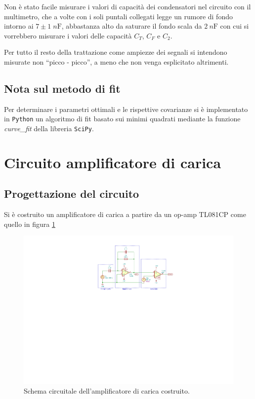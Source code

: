 \documentclass[10pt, a4paper, italian]{article}
\begin{document}
Non è stato facile misurare i valori di capacità dei condensatori nel
circuito con il multimetro, che a volte con i soli puntali collegati legge
un rumore di fondo intorno ai $7 \pm 1 \; \si{n\F}$, abbastanza alto da
saturare il fondo scala da $\SI{2}{n\F}$ con cui si vorrebbero misurare i
valori delle capacità $C_T$, $C_F$ e $C_2$.

Per tutto il resto della trattazione come ampiezze dei segnali si intendono
misurate non ``picco - picco'', a meno che non venga esplicitato altrimenti.

\subsection*{Nota sul metodo di fit}
Per determinare i parametri ottimali e le rispettive covarianze si \`e
implementato in \verb+Python+ un algoritmo di fit basato sui minimi quadrati
mediante la funzione \emph{curve\_fit} della libreria \texttt{SciPy}.

\section{Circuito amplificatore di carica}
\subsection{Progettazione del circuito}
Si è costruito un amplificatore di carica a partire da un op-amp TL081CP come
quello in figura \ref{fig: Qampschm}

\begin{figure}[htbp]
    \centering
	\includegraphics[scale=1.2]{Qamp}
    \caption{Schema circuitale dell'amplificatore di carica costruito.
    \label{fig: Qampschm}}
\end{figure}
\end{document}
